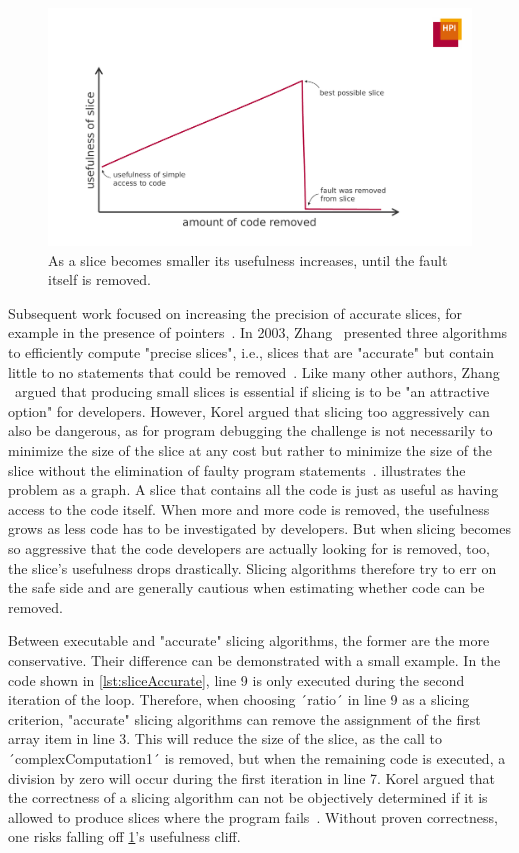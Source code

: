 \begin{figure}[t]
\centering
\includegraphics[width=.75\linewidth]{img/slice_usefulness}
\caption{As a slice becomes smaller its usefulness increases, until the fault itself is removed.}
\label{fig:slice_usefulness}
\end{figure}

Subsequent work focused on increasing the precision of accurate slices, for example in the presence of pointers~\cite{atkinson02:program_slicing_using_dynamic, agrawal91:dynamic_slicing_in}.
In 2003, Zhang \etal\ presented three algorithms to efficiently compute "precise slices", i.e., slices that are "accurate" but contain little to no statements that could be removed~\cite{zhang03:precise_dynamic_slicing_algorithms}.
Like many other authors, Zhang \etal\ argued that producing small slices is essential if slicing is to be "an attractive option" for developers.
However, Korel argued that slicing too aggressively can also be dangerous, as
for program debugging the challenge is not necessarily to minimize the size of the slice at any cost but rather to minimize the size of the slice without the elimination of faulty program statements~\cite{korel98:dynamic_program_slicing_methods}.
 illustrates the problem as a graph.
A slice that contains all the code is just as useful as having access to the code itself.
When more and more code is removed, the usefulness grows as less code has to be investigated by developers.
But when slicing becomes so aggressive that the code developers are actually looking for is removed, too, 
the slice's usefulness drops drastically.
Slicing algorithms therefore try to err on the safe side and are generally cautious when estimating whether code can be removed.

Between executable and "accurate" slicing algorithms, the former are the more conservative.
Their difference can be demonstrated with a small example.
In the code shown in \cref{lst:sliceAccurate}, line 9 is only executed during the second iteration of the loop.
Therefore, when choosing ´ratio´ in line 9 as a slicing criterion, "accurate" slicing algorithms can remove the assignment of the first array item in line 3.
This will reduce the size of the slice, as the call to ´complexComputation1´ is removed, but when the remaining code is executed, a division by zero will occur during the first iteration in line 7.
Korel argued that the correctness of a slicing algorithm can not be objectively determined if it is allowed to produce slices where the program fails~\cite{korel98:dynamic_program_slicing_methods}.
Without proven correctness, one risks falling off \cref{fig:slice_usefulness}'s usefulness cliff.

